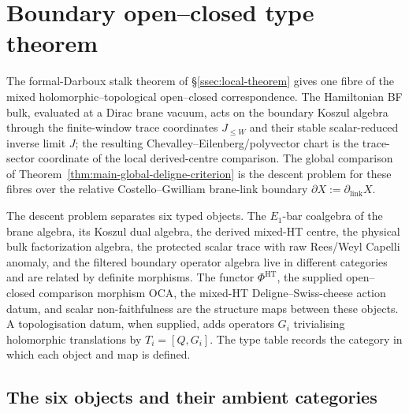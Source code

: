 \section{Boundary open--closed type theorem}\label{sec:typed-master}

The formal-Darboux stalk theorem of \S\ref{ssec:local-theorem} gives
one fibre of the mixed holomorphic--topological open--closed
correspondence.  The Hamiltonian BF bulk, evaluated at a Dirac brane
vacuum, acts on the boundary Koszul algebra through the finite-window
trace coordinates \(J_{\leq W}\) and their stable scalar-reduced inverse
limit \(J\); the resulting
Chevalley--Eilenberg/polyvector chart is the trace-sector coordinate of
the local derived-centre comparison.  The global comparison of
Theorem~\ref{thm:main-global-deligne-criterion} is the descent problem for
these fibres over the relative Costello--Gwilliam brane-link boundary
\(\partial X:=\partial_{\mathrm{link}}X\).

The descent problem separates six typed objects.  The \(E_1\)-bar coalgebra of
the brane algebra, its Koszul dual algebra, the derived mixed-HT
centre, the physical bulk factorization algebra, the protected scalar
trace with raw Rees/Weyl Capelli anomaly, and the filtered boundary operator algebra
live in different categories and are related by definite morphisms.
The functor \(\Phi^{\mathrm{HT}}\), the supplied open--closed comparison
morphism \(\mathrm{OCA}\), the mixed-HT Deligne--Swiss-cheese action
datum, and scalar non-faithfulness are the structure maps between these
objects.  A topologisation datum, when supplied, adds operators
\(G_i\) trivialising holomorphic translations by
\(T_i=[Q,G_i]\).  The type table records the category in which each
object and map is defined.

\subsection{The six objects and their ambient categories}\label{ssec:six-typed-objects}


